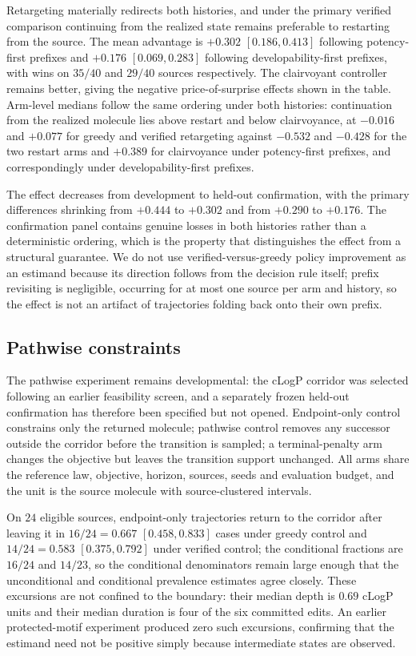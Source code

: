 Retargeting materially redirects both histories, and under the primary verified comparison continuing from the realized state remains preferable to restarting from the source. The mean advantage is $+0.302$ $[0.186,0.413]$ following potency-first prefixes and $+0.176$ $[0.069,0.283]$ following developability-first prefixes, with wins on $35/40$ and $29/40$ sources respectively. The clairvoyant controller remains better, giving the negative price-of-surprise effects shown in the table. Arm-level medians follow the same ordering under both histories: continuation from the realized molecule lies above restart and below clairvoyance, at $-0.016$ and $+0.077$ for greedy and verified retargeting against $-0.532$ and $-0.428$ for the two restart arms and $+0.389$ for clairvoyance under potency-first prefixes, and correspondingly under developability-first prefixes.

The effect decreases from development to held-out confirmation, with the primary differences shrinking from $+0.444$ to $+0.302$ and from $+0.290$ to $+0.176$. The confirmation panel contains genuine losses in both histories rather than a deterministic ordering, which is the property that distinguishes the effect from a structural guarantee. We do not use verified-versus-greedy policy improvement as an estimand because its direction follows from the decision rule itself; prefix revisiting is negligible, occurring for at most one source per arm and history, so the effect is not an artifact of trajectories folding back onto their own prefix.

\subsection{Pathwise constraints}
\label{app:exp-pathwise}

The pathwise experiment remains developmental: the cLogP corridor was selected following an earlier feasibility screen, and a separately frozen held-out confirmation has therefore been specified but not opened. Endpoint-only control constrains only the returned molecule; pathwise control removes any successor outside the corridor before the transition is sampled; a terminal-penalty arm changes the objective but leaves the transition support unchanged. All arms share the reference law, objective, horizon, sources, seeds and evaluation budget, and the unit is the source molecule with source-clustered intervals.

On $24$ eligible sources, endpoint-only trajectories return to the corridor after leaving it in $16/24=0.667$ $[0.458,0.833]$ cases under greedy control and $14/24=0.583$ $[0.375,0.792]$ under verified control; the conditional fractions are $16/24$ and $14/23$, so the conditional denominators remain large enough that the unconditional and conditional prevalence estimates agree closely. These excursions are not confined to the boundary: their median depth is $0.69$ cLogP units and their median duration is four of the six committed edits. An earlier protected-motif experiment produced zero such excursions, confirming that the estimand need not be positive simply because intermediate states are observed.

